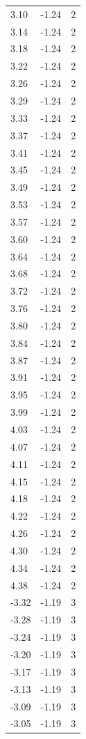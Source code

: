 \begin{longtable}{lrr}
  3.10 & -1.24 & 2 \\
  3.14 & -1.24 & 2 \\
  3.18 & -1.24 & 2 \\
  3.22 & -1.24 & 2 \\
  3.26 & -1.24 & 2 \\
  3.29 & -1.24 & 2 \\
  3.33 & -1.24 & 2 \\
  3.37 & -1.24 & 2 \\
  3.41 & -1.24 & 2 \\
  3.45 & -1.24 & 2 \\
  3.49 & -1.24 & 2 \\
  3.53 & -1.24 & 2 \\
  3.57 & -1.24 & 2 \\
  3.60 & -1.24 & 2 \\
  3.64 & -1.24 & 2 \\
  3.68 & -1.24 & 2 \\
  3.72 & -1.24 & 2 \\
  3.76 & -1.24 & 2 \\
  3.80 & -1.24 & 2 \\
  3.84 & -1.24 & 2 \\
  3.87 & -1.24 & 2 \\
  3.91 & -1.24 & 2 \\
  3.95 & -1.24 & 2 \\
  3.99 & -1.24 & 2 \\
  4.03 & -1.24 & 2 \\
  4.07 & -1.24 & 2 \\
  4.11 & -1.24 & 2 \\
  4.15 & -1.24 & 2 \\
  4.18 & -1.24 & 2 \\
  4.22 & -1.24 & 2 \\
  4.26 & -1.24 & 2 \\
  4.30 & -1.24 & 2 \\
  4.34 & -1.24 & 2 \\
  4.38 & -1.24 & 2 \\
  -3.32 & -1.19 & 3 \\
  -3.28 & -1.19 & 3 \\
  -3.24 & -1.19 & 3 \\
  -3.20 & -1.19 & 3 \\
  -3.17 & -1.19 & 3 \\
  -3.13 & -1.19 & 3 \\
  -3.09 & -1.19 & 3 \\
  -3.05 & -1.19 & 3 \\

\end{longtable}
